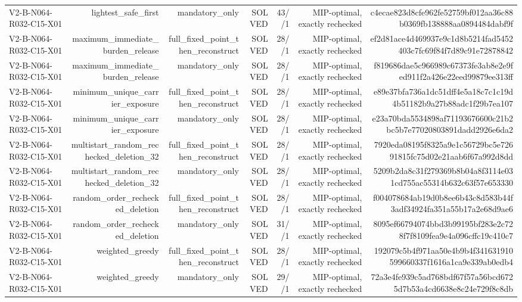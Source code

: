 {\begin{longtable}{lrrrrrr}
V2-B-N064-R032-C15-X01 & lightest\_safe\_first & mandatory\_only & SOLVED & 43//1 & MIP-optimal, exactly rechecked & c4ecae823d8cfe962fe52759bf012aa36c88b0369fb138888aa0894484dabf9f \\
V2-B-N064-R032-C15-X01 & maximum\_immediate\_burden\_release & full\_fixed\_point\_then\_reconstruct & SOLVED & 28//1 & MIP-optimal, exactly rechecked & ef2d81ace4d469937e9c1d8b5214fad5452403c7fc69f84f7d89c91e72878842 \\
V2-B-N064-R032-C15-X01 & maximum\_immediate\_burden\_release & mandatory\_only & SOLVED & 28//1 & MIP-optimal, exactly rechecked & f819686dae5c966989c67373fe3ab8e2e9fed911f2a426e22eed99879ee313ff \\
V2-B-N064-R032-C15-X01 & minimum\_unique\_carrier\_exposure & full\_fixed\_point\_then\_reconstruct & SOLVED & 28//1 & MIP-optimal, exactly rechecked & e89e37bfa736a1dc51dff4e5a18c7c1c19d4b51182b9a27b88adc1f29b7ea107 \\
V2-B-N064-R032-C15-X01 & minimum\_unique\_carrier\_exposure & mandatory\_only & SOLVED & 28//1 & MIP-optimal, exactly rechecked & e23a70bda5534898af71193676600c21b2bc5b7e77020803891dadd2926e6da2 \\
V2-B-N064-R032-C15-X01 & multistart\_random\_rechecked\_deletion\_32 & full\_fixed\_point\_then\_reconstruct & SOLVED & 28//1 & MIP-optimal, exactly rechecked & 7920eda08195f8325a9e1c56729bc5e72691815fc75d02e21aab6f67a992d8dd \\
V2-B-N064-R032-C15-X01 & multistart\_random\_rechecked\_deletion\_32 & mandatory\_only & SOLVED & 28//1 & MIP-optimal, exactly rechecked & 5209b2da8c31f279369b8b04a8f3114e031cd755ac55314b632c63f57e653330 \\
V2-B-N064-R032-C15-X01 & random\_order\_rechecked\_deletion & full\_fixed\_point\_then\_reconstruct & SOLVED & 28//1 & MIP-optimal, exactly rechecked & f004078684ab19d0b8ee6b43c8d583b44f3adf34924fa351a55b17a2e68d9ae6 \\
V2-B-N064-R032-C15-X01 & random\_order\_rechecked\_deletion & mandatory\_only & SOLVED & 31//1 & MIP-optimal, exactly rechecked & 8095ef66794074bbd3b99195bf283e2c728f7f8109fea9e4a096cffc19c410c7 \\
V2-B-N064-R032-C15-X01 & weighted\_greedy & full\_fixed\_point\_then\_reconstruct & SOLVED & 28//1 & MIP-optimal, exactly rechecked & 192079c5b4f971aa50e4b9b4f341631910599660337f1616a1ca9e339ab0edb4 \\
V2-B-N064-R032-C15-X01 & weighted\_greedy & mandatory\_only & SOLVED & 29//1 & MIP-optimal, exactly rechecked & 72a3e4fe939c5ad768bdf67f57a56bcd6725d7b53a4cd6638e8c24e729f8c8db \\

\end{longtable}}
